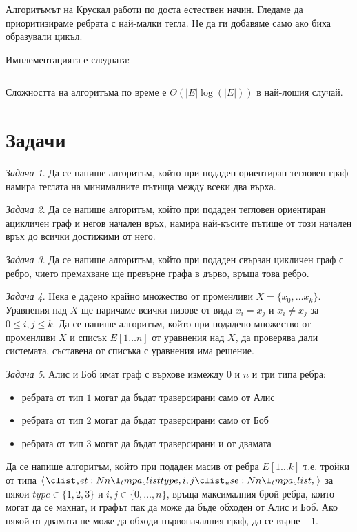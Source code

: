 \documentclass{article}
\theoremstyle{definition}
\theoremstyle{plain}
\theoremstyle{remark}
\newtheorem{problem}{Задача}
\theoremstyle{definition}
\begin{document}
Алгоритъмът на Крускал работи по доста естествен начин.
Гледаме да приоритизираме ребрата с най-малки тегла.
Не да ги добавяме само ако биха образували цикъл.

Имплементацията е следната:
\inputminted[linenos]{c++}{algorithms/kruskal.cpp}
Сложността на алгоритъма по време е $\Theta(|E|\log(|E|))$ в най-лошия случай.

\section*{Задачи}

\begin{problem}
Да се напише алгоритъм, който при подаден ориентиран тегловен граф намира теглата на минималните пътища между всеки два върха.
\end{problem}

\begin{problem}
Да се напише алгоритъм, който при подаден тегловен ориентиран ацикличен граф и негов начален връх, намира най-късите пътище от този начален връх до всички достижими от него.
\end{problem}

\begin{problem}
Да се напише алгоритъм, който при подаден свързан цикличен граф с ребро, чието премахване ще превърне графа в дърво, връща това ребро.
\end{problem}

\begin{problem}
Нека е дадено крайно множество от променливи $X = \{ x_0, \dots x_k \}$.
Уравнения над $X$ ще наричаме всички низове от вида $x_i = x_j$ и $x_i \neq x_j$ за $0 \leq i, j \leq k$.
Да се напише алгоритъм, който при подадено множество от променливи $X$ и списък $E[1 \dots n]$ от уравнения над $X$, да проверява дали системата, съставена от списъка с уравнения има решение.
\end{problem}

\begin{problem}
Алис и Боб имат граф с върхове измежду $0$ и $n$ и три типа ребра:
\begin{itemize}
  \item ребрата от тип $1$ могат да бъдат траверсирани само от Алис
  \item ребрата от тип $2$ могат да бъдат траверсирани само от Боб
  \item ребрата от тип $3$ могат да бъдат траверсирани и от двамата
\end{itemize}
Да се напише алгоритъм, който при подаден масив от ребра $E[1 \dots k]$ т.е. тройки от типа $\opair{type, i, j}$ за някои $type \in \{1, 2, 3\}$ и $i, j \in \{ 0, \dots, n \}$, връща максималния брой ребра, които могат да се махнат, и графът пак да може да бъде обходен от Алис и Боб.
Ако някой от двамата не може да обходи първоначалния граф, да се върне $-1$.
\end{problem}
\end{document}
